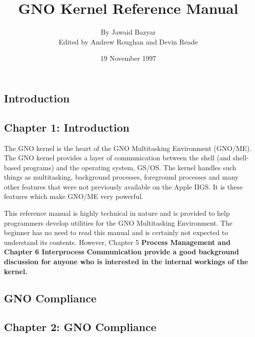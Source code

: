\documentclass{report}
\begin{document}
\title{GNO Kernel Reference Manual}
\author{By Jawaid Bazyar \\ Edited by Andrew Roughan and Devin Reade}
\date{19 November 1997}
\maketitle

\begin{latexonly}
\tableofcontents
\end{latexonly}

\parindent=0pt
\parskip=1pc

%
%

\begin{latexonly}
\chapter{Introduction}
\end{latexonly}
\begin{htmlonly}
\chapter{Chapter 1:  Introduction}
\end{htmlonly}

The GNO kernel is the heart of the GNO Multitasking Environment
(GNO/ME).  The GNO kernel provides a
layer of communication between the shell (and shell-based
programs) and the operating system, GS/OS. The kernel handles
such things as multitasking, 
background processes, foreground
processes and many other features that were not previously
available on the Apple IIGS. It is these features which make
GNO/ME very powerful.

This reference manual is highly technical
in nature and is provided to help programmers develop utilities
for the GNO Multitasking Environment. The beginner has no need to
read this manual and is certainly not expected to understand its
contents. However, Chapter 5 \bf Process Management \rm and
Chapter 6 \bf Interprocess Communication \rm provide a good
background discussion for anyone who is interested in the
internal workings of the kernel.

%
%

\begin{latexonly}
\chapter{GNO Compliance}
\end{latexonly}
\begin{htmlonly}
\chapter{Chapter 2:  GNO Compliance}
\end{htmlonly}
\end{document}
